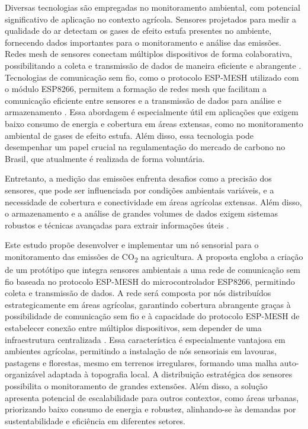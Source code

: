 Diversas tecnologias são empregadas no monitoramento ambiental, com potencial significativo de aplicação no contexto agrícola. Sensores projetados para medir a qualidade do ar detectam os gases de efeito estufa presentes no ambiente, fornecendo dados importantes para o monitoramento e análise das emissões. Redes mesh de sensores conectam múltiplos dispositivos de forma colaborativa, possibilitando a coleta e transmissão de dados de maneira eficiente e abrangente \cite{zhao2018wsn}. Tecnologias de comunicação sem fio, como o protocolo ESP-MESH utilizado com o módulo ESP8266, permitem a formação de redes mesh que facilitam a comunicação eficiente entre sensores e a transmissão de dados para análise e armazenamento \cite{espressif2024mesh}. Essa abordagem é especialmente útil em aplicações que exigem baixo consumo de energia e cobertura em áreas extensas, como no monitoramento ambiental de gases de efeito estufa. Além disso, essa tecnologia pode desempenhar um papel crucial na regulamentação do mercado de carbono no Brasil, que atualmente é realizada de forma voluntária.

Entretanto, a medição das emissões enfrenta desafios como a precisão dos sensores, que pode ser influenciada por condições ambientais variáveis, e a necessidade de cobertura e conectividade em áreas agrícolas extensas. Além disso, o armazenamento e a análise de grandes volumes de dados exigem sistemas robustos e técnicas avançadas para extrair informações úteis \cite{liu2018iot}.

Este estudo propõe desenvolver e implementar um nó sensorial para o monitoramento das emissões de CO\textsubscript{2} na agricultura. A proposta engloba a criação de um protótipo que integra sensores ambientais a uma rede de comunicação sem fio baseada no protocolo ESP-MESH do microcontrolador ESP8266, permitindo coleta e transmissão de dados. A rede será composta por nós distribuídos estrategicamente em áreas agrícolas, garantindo cobertura abrangente graças à possibilidade de comunicação sem fio e à capacidade do protocolo ESP-MESH de estabelecer conexão entre múltiplos dispositivos, sem depender de uma infraestrutura centralizada \cite{espressif2024mesh}. Essa característica é especialmente vantajosa em ambientes agrícolas, permitindo a instalação de nós sensoriais em lavouras, pastagens e florestas, mesmo em terrenos irregulares, formando uma malha auto-organizável adaptada à topografia local. A distribuição estratégica dos sensores possibilita o monitoramento de grandes extensões. Além disso, a solução apresenta potencial de escalabilidade para outros contextos, como áreas urbanas, priorizando baixo consumo de energia e robustez, alinhando-se às demandas por sustentabilidade e eficiência em diferentes setores.

